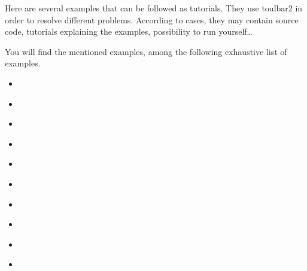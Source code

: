\documentclass[letterpaper,10pt,openany,oneside,english]{sphinxmanual}
\begin{document}
\sphinxAtStartPar
Here are several examples that can be followed as tutorials.
They use toulbar2 in order to resolve different problems.
According to cases, they may contain source code, tutorials explaining the examples, possibility to run yourself…

\sphinxAtStartPar
You will find the mentioned examples, among the following exhaustive
list of examples.
\begin{itemize}
\item {} 
\sphinxAtStartPar
{\hyperref[\detokenize{examples/tuto_wnqp:tuto-wnqp}]{}}

\item {} 
\sphinxAtStartPar
{\hyperref[\detokenize{examples/tuto_wlsp:tuto-wlsp}]{}}

\item {} 
\sphinxAtStartPar
{\hyperref[\detokenize{examples/tuto_rlfap:tuto-rlfap}]{}}

\item {} 
\sphinxAtStartPar
{\hyperref[\detokenize{examples/tuto_fapwp:tuto-fapwp}]{}}

\item {} 
\sphinxAtStartPar
{\hyperref[\detokenize{examples/tuto_medp:tuto-medp}]{}}

\item {} 
\sphinxAtStartPar
{\hyperref[\detokenize{examples/tuto_bmp:tuto-bmp}]{}}

\item {} 
\sphinxAtStartPar
{\hyperref[\detokenize{examples/tuto_alp:tuto-alp}]{}}

\item {} 
\sphinxAtStartPar
{\hyperref[\detokenize{examples/tuto_wlp:tuto-wlp}]{}}

\item {} 
\sphinxAtStartPar
{\hyperref[\detokenize{examples/tuto_spp:tuto-spp}]{}}

\item {} 
\sphinxAtStartPar
{\hyperref[\detokenize{examples/tuto_sspp:tuto-sspp}]{}}


\end{itemize}
\end{document}
